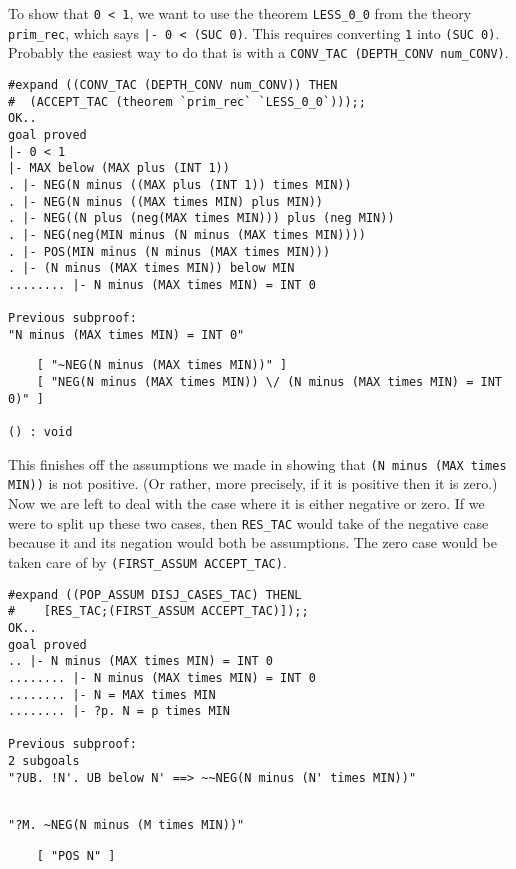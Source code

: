 To show that {\small\verb+0 < 1+}, we want to use the theorem
{\small\verb+LESS_0_0+} from the theory {\small\verb+prim_rec+}, which
says {\small\verb+|- 0 < (SUC 0)+}.  This requires converting
{\small\tt 1} into {\small\verb+(SUC 0)+}.  Probably the easiest way
to do that is with a {\small\verb+CONV_TAC (DEPTH_CONV num_CONV)+}.
\begin{session}
\begin{verbatim}
#expand ((CONV_TAC (DEPTH_CONV num_CONV)) THEN
#  (ACCEPT_TAC (theorem `prim_rec` `LESS_0_0`)));;
OK..
goal proved
|- 0 < 1
|- MAX below (MAX plus (INT 1))
. |- NEG(N minus ((MAX plus (INT 1)) times MIN))
. |- NEG(N minus ((MAX times MIN) plus MIN))
. |- NEG((N plus (neg(MAX times MIN))) plus (neg MIN))
. |- NEG(neg(MIN minus (N minus (MAX times MIN))))
. |- POS(MIN minus (N minus (MAX times MIN)))
. |- (N minus (MAX times MIN)) below MIN
........ |- N minus (MAX times MIN) = INT 0

Previous subproof:
"N minus (MAX times MIN) = INT 0"
\end{verbatim}
\mvdots
\begin{verbatim}
    [ "~NEG(N minus (MAX times MIN))" ]
    [ "NEG(N minus (MAX times MIN)) \/ (N minus (MAX times MIN) = INT 0)" ]

() : void
\end{verbatim}
\end{session}

This finishes off the assumptions we made in showing that
{\small\verb+(N minus (MAX times MIN))+} is not positive.  (Or rather,
more precisely, if it is positive then it is zero.)  Now we are left to
deal with the case where it is either negative or zero.  If we were to
split up these two cases, then {\small\verb+RES_TAC+} would take of the
negative case because it and its negation would both be assumptions.
The zero case would be taken care of by
{\small\verb+(FIRST_ASSUM ACCEPT_TAC)+}.

\newpage %

\begin{session}
\begin{verbatim}
#expand ((POP_ASSUM DISJ_CASES_TAC) THENL
#    [RES_TAC;(FIRST_ASSUM ACCEPT_TAC)]);;
OK..
goal proved
.. |- N minus (MAX times MIN) = INT 0
........ |- N minus (MAX times MIN) = INT 0
........ |- N = MAX times MIN
........ |- ?p. N = p times MIN

Previous subproof:
2 subgoals
"?UB. !N'. UB below N' ==> ~~NEG(N minus (N' times MIN))"
\end{verbatim}
\mvdots
\begin{verbatim}

"?M. ~NEG(N minus (M times MIN))"
\end{verbatim}
\mvdots
\begin{verbatim}
    [ "POS N" ]
\end{verbatim}
\evdots
\end{session}

